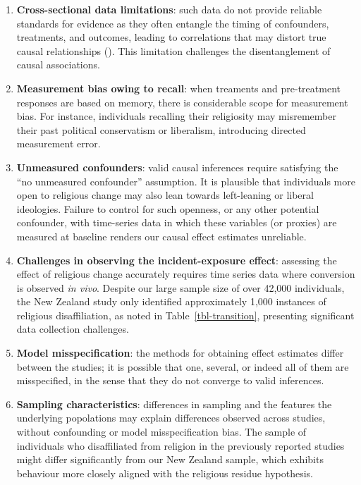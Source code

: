 \documentclass[
  singlecolumn]{article}
\begin{document}
\begin{enumerate}
\def\labelenumi{\arabic{enumi}.}
\item
  \textbf{Cross-sectional data limitations}: such data do not provide
  reliable standards for evidence as they often entangle the timing of
  confounders, treatments, and outcomes, leading to correlations that
  may distort true causal relationships
  (). This limitation
  challenges the disentanglement of causal associations.
\item
  \textbf{Measurement bias owing to recall}: when treaments and
  pre-treatment responses are based on memory, there is considerable
  scope for measurement bias. For instance, individuals recalling their
  religiosity may misremember their past political conservatism or
  liberalism, introducing directed measurement error.
\item
  \textbf{Unmeasured confounders}: valid causal inferences require
  satisfying the ``no unmeasured confounder'' assumption. It is
  plausible that individuals more open to religious change may also lean
  towards left-leaning or liberal ideologies. Failure to control for
  such openness, or any other potential confounder, with time-series
  data in which these variables (or proxies) are measured at baseline
  renders our causal effect estimates unreliable.
\item
  \textbf{Challenges in observing the incident-exposure effect}:
  assessing the effect of religious change accurately requires time
  series data where conversion is observed \emph{in vivo}. Despite our
  large sample size of over 42,000 individuals, the New Zealand study
  only identified approximately 1,000 instances of religious
  disaffiliation, as noted in Table~\ref{tbl-transition}, presenting
  significant data collection challenges.
\item
  \textbf{Model misspecification}: the methods for obtaining effect
  estimates differ between the studies; it is possible that one,
  several, or indeed all of them are misspecified, in the sense that
  they do not converge to valid inferences.
\item
  \textbf{Sampling characteristics}: differences in sampling and the
  features the underlying popolations may explain differences observed
  across studies, without confounding or model misspecification bias.
  The sample of individuals who disaffiliated from religion in the
  previously reported studies might differ significantly from our New
  Zealand sample, which exhibits behaviour more closely aligned with the
  religious residue hypothesis.
\end{enumerate}
\end{document}
